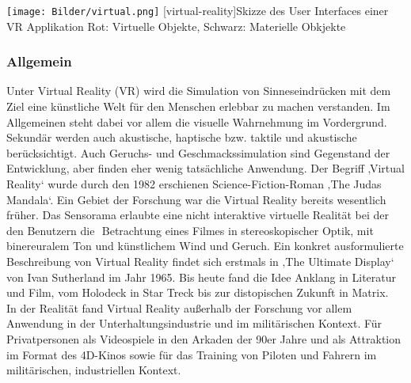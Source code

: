 \documentclass[12pt,a4paper,bibliography=totocnumbered,listof=totocnumbered]{scrartcl}
\begin{document}
\begin{minipage}{\linewidth}
\vspace{1em}
	\centering
	\texttt{[image: Bilder/virtual.png]}
	[virtual-reality]{Skizze des User Interfaces einer VR Applikation\newline
	Rot: Virtuelle Objekte, Schwarz: Materielle Obkjekte}
	\label{fig:virtual_reality}
\vspace{1em}
\end{minipage}

\subsubsection{Allgemein}
Unter Virtual Reality (\ac{VR}) wird die Simulation von Sinneseindrücken mit dem Ziel eine künstliche Welt für den Menschen erlebbar zu machen verstanden. Im Allgemeinen steht dabei vor allem die visuelle Wahrnehmung im Vordergrund. Sekundär werden auch akustische, haptische bzw. taktile und akustische berücksichtigt. Auch Geruchs- und Geschmackssimulation sind Gegenstand der Entwicklung, aber finden eher wenig tatsächliche Anwendung.
Der Begriff ‚Virtual Reality‘ wurde durch den 1982 erschienen Science-Fiction-Roman ‚The Judas Mandala‘. Ein Gebiet der Forschung war die Virtual Reality bereits wesentlich früher.
Das Sensorama erlaubte eine nicht interaktive virtuelle Realität bei der den Benutzern die  Betrachtung eines Filmes in stereoskopischer Optik, mit binereuralem Ton und künstlichem Wind und Geruch. Ein konkret ausformulierte Beschreibung von Virtual Reality findet sich erstmals in ‚The Ultimate Display‘ von Ivan Sutherland im Jahr 1965. Bis heute fand die Idee Anklang in Literatur und Film, vom Holodeck in Star Treck bis zur distopischen Zukunft in Matrix.  In der Realität fand Virtual Reality außerhalb der Forschung vor allem Anwendung in der Unterhaltungsindustrie und im militärischen Kontext. Für Privatpersonen als Videospiele in den Arkaden der 90er Jahre und als Attraktion im Format des 4D-Kinos sowie für das Training von Piloten und Fahrern im militärischen, industriellen Kontext.
\end{document}

